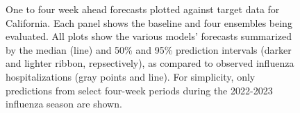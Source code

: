 \documentclass[
]{article}
\begin{document}
\begin{figure}


\caption{\label{fig-plot-forecasts-hubVis}One to four week ahead
forecasts plotted against target data for California. Each panel shows
the baseline and four ensembles being evaluated. All plots show the
various models' forecasts summarized by the median (line) and 50\% and
95\% prediction intervals (darker and lighter ribbon, repsectively), as
compared to observed influenza hospitalizations (gray points and line).
For simplicity, only predictions from select four-week periods during
the 2022-2023 influenza season are shown.}

\end{figure}%
\end{document}
